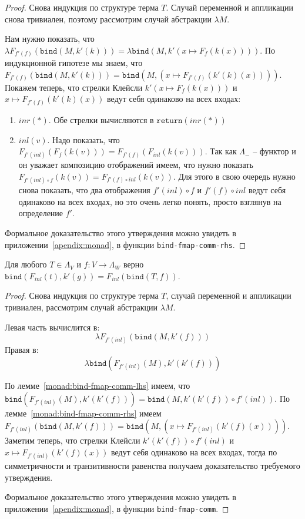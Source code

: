 \begin{proof}
  Снова индукция по структуре терма $T$. Случай переменной и аппликации снова тривиален, поэтому рассмотрим случай абстракции $\lambda M$.

  Нам нужно показать, что $\lambda F_{f'(f)}(\texttt{bind}(M, k'(k))) = \lambda \texttt{bind}(M, k'(x \mapsto F_{f}(k(x))))$. По индукционной гипотезе мы знаем, что $F_{f'(f)}(\texttt{bind}(M, k'(k))) = \texttt{bind}(M, (x \mapsto F_{f'(f)}(k'(k)(x))))$. Покажем теперь, что стрелки Клейсли $ k'(x \mapsto F_{f}(k(x))) $ и $ x \mapsto F_{f'(f)}(k'(k)(x)) $ ведут себя одинаково на всех входах:

  \begin{enumerate}
    \item $inr(*)$. Обе стрелки вычисляются в $\texttt{return}(inr(*))$
    \item $inl(v)$. Надо показать, что $F_{f'(inl)}(F_{f}(k(v))) = F_{f'(f)}(F_{inl}(k(v)))$. Так как $\Lambda_{-}$ -- функтор и он уважает композицию отображений имеем, что нужно показать $F_{f'(inl) \circ f}(k(v)) = F_{f'(f) \circ inl}(k(v))$. Для этого в свою очередь нужно снова показать, что два отображения $f'(inl) \circ f$ и $f'(f) \circ inl$ ведут себя одинаково на всех входах, но это очень легко понять, просто взглянув на определение $f'$.
  \end{enumerate}

  Формальное доказательство этого утверждения можно увидеть в приложении~\ref{apendix:monad}, в функции \texttt{bind-fmap-comm-rhs}.
\end{proof}

\begin{lemma}
  \label{monad:bind-fmap-comm}
  Для любого $T \in \Lambda_{V}$ и $f : V \to \Lambda_{W}$ верно $\texttt{bind}(F_{inl}(t), k'(g)) = F_{inl}(\texttt{bind}(T, f))$.
\end{lemma}

\begin{proof}
  Снова индукция по структуре терма $T$, случай переменной и аппликации тривиален, рассмотрим случай абстракции $\lambda M$.

  Левая часть вычислится в:
  $$ \lambda F_{f'(inl)}(\texttt{bind}(M, k'(f))) $$
  Правая в:
  $$ \lambda \texttt{bind}(F_{f'(inl)}(M), k'(k'(f))) $$

  По лемме~\ref{monad:bind-fmap-comm-lhs} имеем, что $\texttt{bind}(F_{f'(inl)}(M), k'(k'(f))) = \texttt{bind}(M, k'(k'(f)) \circ f'(inl))$. По лемме~\ref{monad:bind-fmap-comm-rhs} имеем $F_{f'(inl)}(\texttt{bind}(M, k'(f))) = \texttt{bind}(M, (x \mapsto F_{f'(inl)}(k'(f)(x))))$. Заметим теперь, что стрелки Клейсли $k'(k'(f)) \circ f'(inl)$ и $x \mapsto F_{f'(inl)}(k'(f)(x))$ ведут себя одинаково на всех входах, тогда по симметричности и транзитивности равенства получаем доказательство требуемого утверждения.

  Формальное доказательство этого утверждения можно увидеть в приложении~\ref{apendix:monad}, в функции \texttt{bind-fmap-comm}.
\end{proof}

